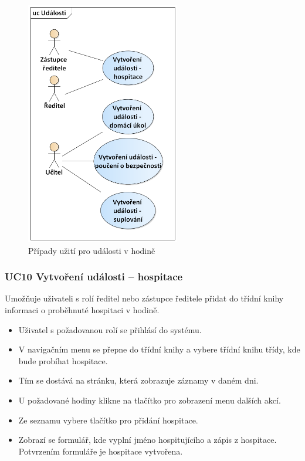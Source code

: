 \begin{figure}[h]
	\centering
	\includegraphics[width=0.6\textwidth]{images/udalosti.png}
	\caption{Případy užití pro události v hodině}
	\label{pripady-udalosti}
\end{figure}

\subsubsection*{UC10 Vytvoření události -- hospitace}
Umožňuje uživateli s rolí ředitel nebo zástupce ředitele přidat do třídní knihy informaci o proběhnuté hospitaci v hodině.

\begin{itemize}
    \item Uživatel s požadovanou rolí se přihlásí do systému.
    \item V navigačním menu se přepne do třídní knihy a vybere třídní knihu třídy, kde bude probíhat hospitace.
    \item Tím se dostává na stránku, která zobrazuje záznamy v daném dni.
    \item U požadované hodiny klikne na tlačítko pro zobrazení menu dalších akcí. 
    \item Ze seznamu vybere tlačítko pro přidání hospitace.
    \item Zobrazí se formulář, kde vyplní jméno hospitujícího a zápis z hospitace. Potvrzením formuláře je hospitace vytvořena.
\end{itemize}


